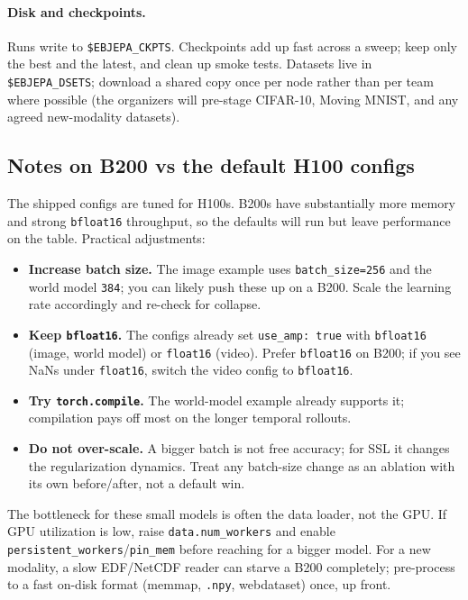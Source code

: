 \documentclass{article}
\newcommand{\code}[1]{\texttt{\small #1}}
\begin{document}
\paragraph{Disk and checkpoints.} Runs write to \code{\$EBJEPA\_CKPTS}. Checkpoints
add up fast across a sweep; keep only the best and the latest, and clean up smoke
tests. Datasets live in \code{\$EBJEPA\_DSETS}; download a shared copy once per
node rather than per team where possible (the organizers will pre-stage CIFAR-10,
Moving MNIST, and any agreed new-modality datasets).

\subsection{Notes on B200 vs the default H100 configs}

The shipped configs are tuned for H100s. B200s have substantially more memory and
strong \code{bfloat16} throughput, so the defaults will run but leave performance on
the table. Practical adjustments:

\begin{itemize}[leftmargin=1.4em,itemsep=1pt,topsep=2pt]
  \item \textbf{Increase batch size.} The image example uses \code{batch\_size=256}
    and the world model \code{384}; you can likely push these up on a B200. Scale
    the learning rate accordingly and re-check for collapse.
  \item \textbf{Keep \code{bfloat16}.} The configs already set \code{use\_amp: true}
    with \code{bfloat16} (image, world model) or \code{float16} (video). Prefer
    \code{bfloat16} on B200; if you see NaNs under \code{float16}, switch the video
    config to \code{bfloat16}.
  \item \textbf{Try \code{torch.compile}.} The world-model example already supports
    it; compilation pays off most on the longer temporal rollouts.
  \item \textbf{Do not over-scale.} A bigger batch is not free accuracy; for SSL it
    changes the regularization dynamics. Treat any batch-size change as an ablation
    with its own before/after, not a default win.
\end{itemize}

\begin{tipbox}
The bottleneck for these small models is often the data loader, not the GPU. If
GPU utilization is low, raise \code{data.num\_workers} and enable
\code{persistent\_workers}/\code{pin\_mem} before reaching for a bigger model. For a
new modality, a slow EDF/NetCDF reader can starve a B200 completely; pre-process to
a fast on-disk format (memmap, \code{.npy}, webdataset) once, up front.
\end{tipbox}
\end{document}
